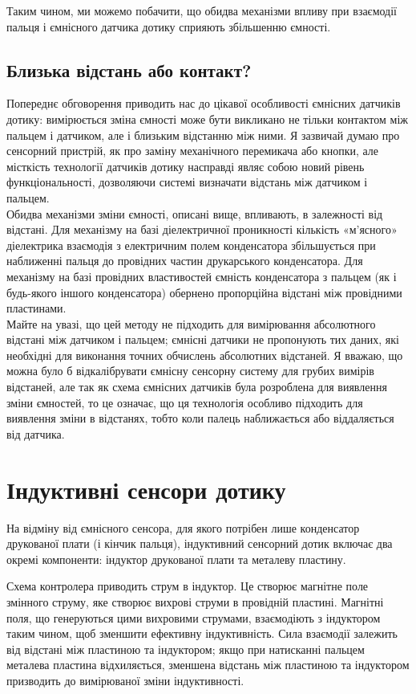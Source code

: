 \documentclass[a4paper,fontsize=12]{report}
\begin{document}
  Таким чином, ми можемо побачити, що обидва механізми впливу при взаємодії пальця і ємнісного датчика дотику сприяють збільшенню ємності.
\section{Близька відстань або контакт?}
  
  Попереднє обговорення приводить нас до цікавої особливості ємнісних датчиків дотику: вимірюється зміна ємності може бути викликано не тільки контактом між пальцем і датчиком, але і близьким відстанню між ними. Я зазвичай думаю про сенсорний пристрій, як про заміну механічного перемикача або кнопки, але місткість технології датчиків дотику насправді являє собою новий рівень функціональності, дозволяючи системі визначати відстань між датчиком і пальцем.\\

  Обидва механізми зміни ємності, описані вище, впливають, в  залежності від відстані. Для механізму на базі діелектричної проникності кількість «м'ясного» діелектрика взаємодія з електричним полем конденсатора збільшується при наближенні пальця до провідних частин друкарського конденсатора. Для механізму на базі провідних властивостей ємність конденсатора з пальцем (як і будь-якого іншого конденсатора) обернено пропорційна відстані між провідними пластинами.\\

  Майте на увазі, що цей методу не підходить для вимірювання абсолютного відстані між датчиком і пальцем; ємнісні датчики не пропонують тих даних, які необхідні для виконання точних обчислень абсолютних відстаней. Я вважаю, що можна було б відкалібрувати ємнісну сенсорну систему для грубих вимірів відстаней, але так як схема ємнісних датчиків була розроблена для виявлення зміни ємностей, то це означає, що ця технологія особливо підходить для виявлення зміни в відстанях, тобто коли палець наближається або віддаляється від датчика.

\chapter{Індуктивні сенсори дотику}
  На відміну від ємнісного  сенсора, для якого потрібен лише конденсатор друкованої плати (і кінчик пальця), індуктивний сенсорний дотик включає два окремі компоненти: індуктор друкованої плати та металеву пластину.\\
  \begin{figure}[ht]
  \end{figure}
  Схема контролера приводить струм   в індуктор. Це створює магнітне поле змінного струму, яке створює вихрові струми в провідній пластині. Магнітні поля, що генеруються цими вихровими струмами, взаємодіють з індуктором таким чином, щоб зменшити ефективну індуктивність. Сила взаємодії залежить від відстані між пластиною та індуктором; якщо при натисканні пальцем металева пластина відхиляється, зменшена відстань між пластиною та індуктором призводить до вимірюваної зміни індуктивності.
\end{document}
